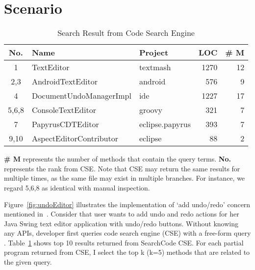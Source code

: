 \section{Scenario}

\begin{table}[ht]
\begin{center}
\caption{Search Result from Code Search Engine}
\label{tab:total}
\scriptsize{
\begin{tabular*}{0.5\textwidth}{@{}c|llrr@{}} \hline
No.&Name&Project&LOC&\# M\\\hline
1&TextEditor&textmash&1270&12\\
2,3&AndroidTextEditor&android&576&9\\
4&DocumentUndoManagerImpl&ide&1227&17\\
5,6,8&ConsoleTextEditor&groovy&321&7\\ 
7&PapyrusCDTEditor&eclipse.papyrus&393&7\\
9,10&AspectEditorContributor&eclipse&88&2\\ \hline
\end{tabular*}
 \label{tab:undoResult}
 \textbf{ \# M} represents the number of methods that contain the query terms. 
 {\bf No.} represents the rank from CSE. Note that CSE may return the same results for multiple times, as the same file may exist in multiple branches. For instance, we regard 5,6,8 as identical with manual inspection. 
 
}
 \end{center}
\end{table}

Figure~\ref{fig:undoEditor} illustrates the implementation of `add undo/redo' concern mentioned in~\cite{Murphy:nlConcern11}.  Consider that user wants to add undo and redo actions for her Java Swing text editor application with undo/redo buttons.  Without knowing any APIs, developer  first queries code search engine (CSE) with a free-form query . Table~\ref{tab:undoResult} shows top 10 results returned from SearchCode CSE. For each partial program returned from CSE, I select the top k (k=5) methods that are related to the given query. 










